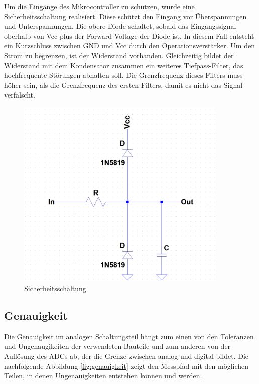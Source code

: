 Um die Eingänge des Mikrocontroller zu schützen, wurde eine Sicherheitsschaltung realisiert. Diese schützt den Eingang vor Überspannungen und Unterspannungen. Die obere Diode schaltet, sobald das Eingangssignal oberhalb von Vcc plus der Forward-Voltage der Diode ist. In diesem Fall entsteht ein Kurzschluss zwischen GND und Vcc durch den Operationsverstärker. Um den Strom zu begrenzen, ist der Widerstand vorhanden. Gleichzeitig bildet der Widerstand mit dem Kondensator zusammen ein weiteres Tiefpass-Filter, das hochfrequente Störungen abhalten soll.  Die Grenzfrequenz dieses Filters muss höher sein, als die Grenzfrequenz des ersten Filters, damit es nicht das Signal verfälscht.


\begin{figure}[H]
\begin{center}
\includegraphics[width=0.9\textwidth]{images/Analoge_Schaltung_Sicherung.png}
\caption{Sicherheitsschaltung}
\label{fig:Sicherheitsschaltung}
\end{center}
\end{figure}


\subsection{Genauigkeit}%
Die Genauigkeit im analogen Schaltungsteil hängt zum einen von den Toleranzen und Ungenaugikeiten der verwendeten Bauteile und zum anderen von der Auflösung des ADCs ab, der die Grenze zwischen analog und digital bildet. Die nachfolgende Abbildung \ref{fig:genauigkeit} zeigt den Messpfad mit den möglichen Teilen, in denen Ungenauigkeiten entstehen können und werden.

